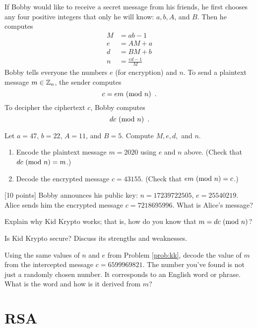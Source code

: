 If Bobby would like to receive a secret message from his friends, he first chooses any four positive integers that only he will know: $a, b, A$, and $B$. Then he computes
\begin{align*}
M &= ab-1 \\
e &= AM+a \\
d &= BM+b \\
n &= \frac{ed-1}{M}
\end{align*}
Bobby tells everyone the numbers $e$ (for encryption) and $n$. To send a plaintext message $m\in\mathbb{Z}_n$, the sender computes
$$ c = em \mbox{\ $\left(\mathrm{mod}\ {n}\right)$} \enspace .$$
To decipher the ciphertext $c$, Bobby computes
$$ dc \mbox{\ $\left(\mathrm{mod}\ {n}\right)$} \enspace .$$

\begin{problem}  [10 points]
Let $a = 47$, $b = 22$, $A=11$, and $B=5$. Compute $M, e, d,$ and $n$.
	\begin{enumerate}
		\item Encode the plaintext message $m = 2020$ using $e$ and $n$ above. (Check that $dc \mbox{\ $\left(\mathrm{mod}\ {n}\right)$} = m$.)
		\item Decode the encrypted message $c = 43155$. (Check that $em \mbox{\ $\left(\mathrm{mod}\ {n}\right)$} = c$.)
	\end{enumerate}
\end{problem}
\begin{problem}
\label{prob:kk}  [10 points]
Bobby announces his public key: $n = 17239722505$, $e = 25540219$. Alice sends him the encrypted message $c = 7218695996$. What is Alice's message?
\end{problem}

\begin{problem}   [10 points]
Explain why Kid Krypto works; that is, how do you know that $m = dc \mbox{\ $\left(\mathrm{mod}\ {n}\right)$}$?
\end{problem}
\begin{problem}  [10 points]
Is Kid Krypto secure? Discuss its strengths and weaknesses.
\end{problem}

\begin{problem}  [10 points]
Using the same values of $n$ and $e$ from Problem \ref{prob:kk}, decode the value of $m$ from the intercepted message $c =6599969821$. The number you've found is not just a randomly chosen number. It corresponds to an English word or phrase. What is the word and how is it derived from $m$?
\end{problem}
	\section{RSA}

